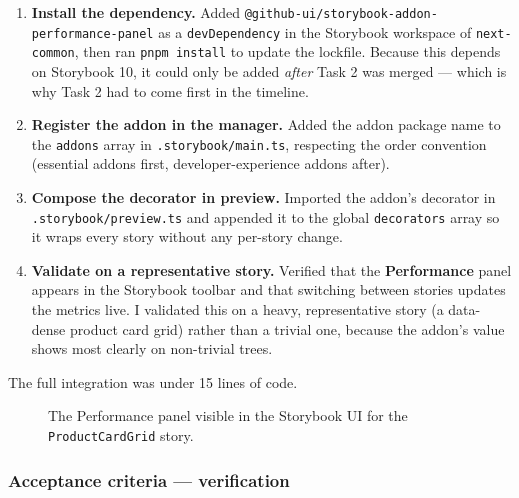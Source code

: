 \begin{enumerate}
    \item \textbf{Install the dependency.} Added \texttt{@github-ui/storybook-addon-performance-panel} as a \texttt{devDependency} in the Storybook workspace of \texttt{next-common}, then ran \texttt{pnpm install} to update the lockfile. Because this depends on Storybook 10, it could only be added \emph{after} Task 2 was merged --- which is why Task 2 had to come first in the timeline.
    \item \textbf{Register the addon in the manager.} Added the addon package name to the \texttt{addons} array in \texttt{.storybook/main.ts}, respecting the order convention (essential addons first, developer-experience addons after).
    \item \textbf{Compose the decorator in preview.} Imported the addon's decorator in \texttt{.storybook/preview.ts} and appended it to the global \texttt{decorators} array so it wraps every story without any per-story change.
    \item \textbf{Validate on a representative story.} Verified that the \textbf{Performance} panel appears in the Storybook toolbar and that switching between stories updates the metrics live. I validated this on a heavy, representative story (a data-dense product card grid) rather than a trivial one, because the addon's value shows most clearly on non-trivial trees.
\end{enumerate}

The full integration was under 15 lines of code.

\begin{figure}[h]
    \centering
    \caption{The Performance panel visible in the Storybook UI for the \texttt{ProductCardGrid} story.}
    \label{fig:x6-perf-panel}
\end{figure}

\subsubsection{Acceptance criteria --- verification}


